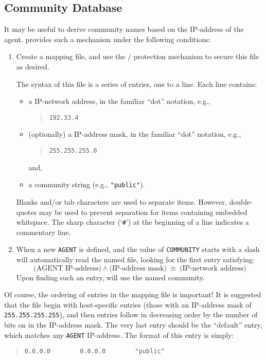 \subsection*	{Community Database}
It may be useful to derive community names based on the IP-address of the
agent.
 provides such a mechanism under the following conditions:
\begin{enumerate}
\item	Create a mapping file, and use the \unix/ protection mechanism to
	secure this file as desired.

	The syntax of this file is a series of entries, one to a line.
	Each line contains:
    \begin{itemize}
    \item	a IP-network address,
		in the familiar ``dot'' notation, e.g.,
\begin{quote}
\verb"192.33.4"
\end{quote}

    \item	(optionally) a IP-address mask,
		in the familiar ``dot'' notation, e.g.,
\begin{quote}
\verb"255.255.255.0"
\end{quote}
		and,

    \item	a community string
		(e.g., \verb|"public"|).
    \end{itemize}
Blanks and/or tab characters are used to separate items.
However, double-quotes may be used to prevent separation for items containing
embedded whitspace.
The sharp character (`\verb"#"') at the beginning of a line indicates a
commentary line.

\item	When a new \verb"AGENT" is defined,
and the value of \verb"COMMUNITY" starts with a slash
 will automatically read the named file,
looking for the first entry satisfying:
$$\mbox{(AGENT IP-address)} \land \mbox{(IP-address mask)}\ \equiv\ 
\mbox{(IP-network address)}$$
Upon finding such an entry,
 will use the named community.
\end{enumerate}

Of course,
the ordering of entries in the mapping file is important!
It is suggested that the file begin with host-specific entries
(those with an IP-address mask of \verb"255.255.255.255"),
and then entries follow in decreasing order by the number of bits on in the
IP-address mask.
The very last entry should be the ``default'' entry,
which matches any \verb"AGENT" IP-address.
The format of this entry is simply:
\begin{quote}\small\begin{verbatim}
0.0.0.0        0.0.0.0        "public"
\end{verbatim}\end{quote}

